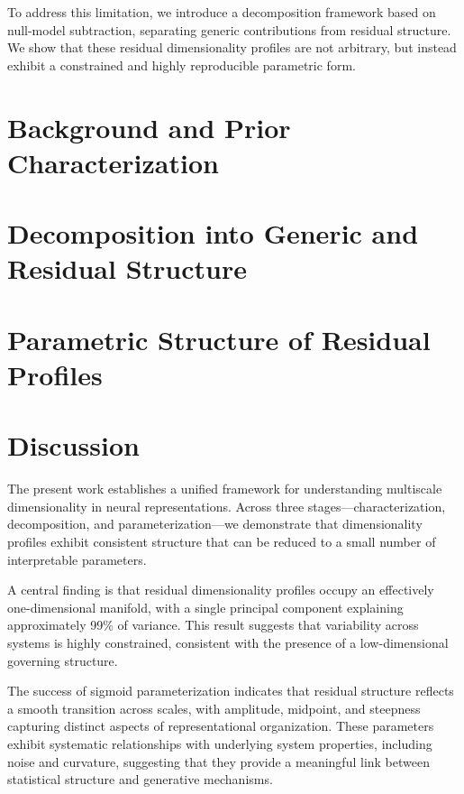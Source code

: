 \documentclass[11pt]{article}
\begin{document}
To address this limitation, we introduce a decomposition framework based on null-model subtraction, separating generic contributions from residual structure. We show that these residual dimensionality profiles are not arbitrary, but instead exhibit a constrained and highly reproducible parametric form.

\section{Background and Prior Characterization}


\section{Decomposition into Generic and Residual Structure}


\section{Parametric Structure of Residual Profiles}


\section{Discussion}

The present work establishes a unified framework for understanding multiscale dimensionality in neural representations. Across three stages---characterization, decomposition, and parameterization---we demonstrate that dimensionality profiles exhibit consistent structure that can be reduced to a small number of interpretable parameters.

A central finding is that residual dimensionality profiles occupy an effectively one-dimensional manifold, with a single principal component explaining approximately 99\% of variance. This result suggests that variability across systems is highly constrained, consistent with the presence of a low-dimensional governing structure.

The success of sigmoid parameterization indicates that residual structure reflects a smooth transition across scales, with amplitude, midpoint, and steepness capturing distinct aspects of representational organization. These parameters exhibit systematic relationships with underlying system properties, including noise and curvature, suggesting that they provide a meaningful link between statistical structure and generative mechanisms.
\end{document}
